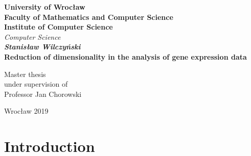 \documentclass[12pt, wide]{mwart}
\newcommand\blankpage{%
    \null
    \thispagestyle{empty}%
    \newpage}
\begin{document}
\newpage
\thispagestyle{empty}
\begin{center}
\textbf{\large University of Wrocław \\Faculty of Mathematics and Computer Science\\ Institute of Computer Science}\\
\textit{\large  Computer Science}\\
\vspace{4cm}
\textbf{\textit{\large Stanisław Wilczyński}\\
\vspace{0.5cm}
{\Large Reduction of dimensionality in the analysis of gene expression data}}\\
\end{center}
\vspace{3cm}
\begin{center}

\large {Master thesis\\
under supervision of\\
Professor Jan Chorowski\\}

\end{center}

\vfill
\begin{center}
\large Wrocław 2019\\
\end{center}

\afterpage{\blankpage}
\newpage
\tableofcontents    
\section{Introduction}
\end{document}

